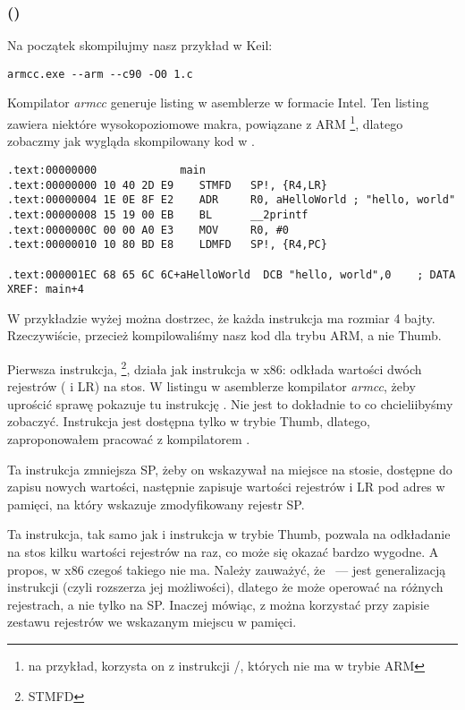 \subsubsection{\NonOptimizingKeilVI (\ARMMode)}

Na początek skompilujmy nasz przykład w Keil:

\begin{lstlisting}
armcc.exe --arm --c90 -O0 1.c 
\end{lstlisting}

\myindex{\IntelSyntax}
Kompilator \emph{armcc} generuje listing w asemblerze w formacie Intel.
Ten listing zawiera niektóre wysokopoziomowe makra, powiązane z ARM
\footnote{na przykład, korzysta on z instrukcji \PUSH/\POP, których nie ma w trybie ARM},
dlatego zobaczmy jak wygląda skompilowany kod w \IDA.

\begin{lstlisting}[caption=\NonOptimizingKeilVI (\ARMMode) \IDA,style=customasmARM]
.text:00000000             main
.text:00000000 10 40 2D E9    STMFD   SP!, {R4,LR}
.text:00000004 1E 0E 8F E2    ADR     R0, aHelloWorld ; "hello, world"
.text:00000008 15 19 00 EB    BL      __2printf
.text:0000000C 00 00 A0 E3    MOV     R0, #0
.text:00000010 10 80 BD E8    LDMFD   SP!, {R4,PC}

.text:000001EC 68 65 6C 6C+aHelloWorld  DCB "hello, world",0    ; DATA XREF: main+4
\end{lstlisting}

W przykładzie wyżej można dostrzec, że każda instrukcja ma rozmiar 4 bajty.
Rzeczywiście, przecież kompilowaliśmy nasz kod dla trybu ARM, a nie Thumb.

Pierwsza instrukcja, \footnote{\ac{STMFD}},
działa jak instrukcja \PUSH w x86: odkłada wartości dwóch rejestrów ( i \ac{LR}) na stos.
W listingu w asemblerze kompilator \emph{armcc}, żeby uprościć sprawę pokazuje tu instrukcję
.
Nie jest to dokładnie to co chcieliibyśmy zobaczyć. Instrukcja \PUSH jest dostępna tylko w trybie Thumb, dlatego,
 zaproponowałem pracować z kompilatorem \IDA.

Ta instrukcja zmniejsza \ac{SP}, żeby on wskazywał na miejsce na stosie, dostępne do zapisu nowych wartości, następnie zapisuje wartości rejestrów  i \ac{LR} 
pod adres w pamięci, na który wskazuje zmodyfikowany rejestr \ac{SP}.

Ta instrukcja, tak samo jak i instrukcja \PUSH w trybie Thumb, pozwala na odkładanie na stos kilku wartości rejestrów na raz, co może się okazać bardzo wygodne.
A propos, w x86 czegoś takiego nie ma.
Należy zauważyć, że ~--- jest generalizacją instrukcji \PUSH (czyli rozszerza jej możliwości), dlatego że może operować na różnych rejestrach, a nie tylko na \ac{SP}.
Inaczej mówiąc, z  można korzystać przy zapisie zestawu rejestrów we wskazanym miejscu w pamięci.


